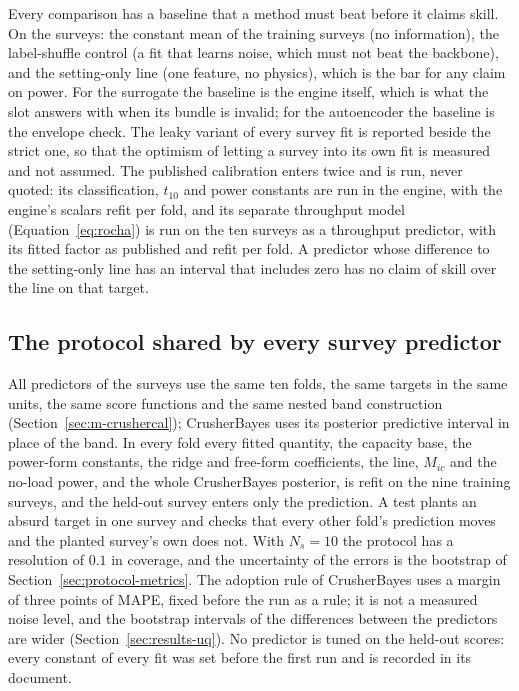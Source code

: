 Every comparison has a baseline that a method must beat before it claims skill. On the surveys: the constant mean of the training surveys
(no information), the label-shuffle control (a fit that learns noise, which must not beat the backbone), and the setting-only line (one
feature, no physics), which is the bar for any claim on power. For the surrogate the baseline is the engine itself, which is what the slot
answers with when its bundle is invalid; for the autoencoder the baseline is the envelope check. The leaky variant of every survey fit is
reported beside the strict one, so that the optimism of letting a survey into its own fit is measured and not assumed. The published
calibration enters twice and is run, never quoted: its classification, $t_{10}$ and power constants are run in the engine, with the engine's
scalars refit per fold, and its separate throughput model (Equation~\eqref{eq:rocha}) is run on the ten surveys as a throughput predictor,
with its fitted factor as published and refit per fold. A predictor whose difference to the setting-only line has an interval that includes
zero has no claim of skill over the line on that target.

\subsection{The protocol shared by every survey predictor}\label{sec:protocol-shared}

All predictors of the surveys use the same ten folds, the same targets in the same units, the same score functions and the same nested band
construction (Section~\ref{sec:m-crushercal}); CrusherBayes uses its posterior predictive interval in place of the band. In every fold every
fitted quantity, the capacity base, the power-form constants, the ridge and free-form coefficients, the line, $M_{ic}$ and the no-load power,
and the whole CrusherBayes posterior, is refit on the nine training surveys, and the held-out survey enters only the prediction. A test plants
an absurd target in one survey and checks that every other fold's prediction moves and the planted survey's own does not. With $N_s=10$ the
protocol has a resolution of $0.1$ in coverage, and the uncertainty of the errors is the bootstrap of Section~\ref{sec:protocol-metrics}. The
adoption rule of CrusherBayes uses a margin of three points of MAPE, fixed before the run as a rule; it is not a measured noise level, and the
bootstrap intervals of the differences between the predictors are wider (Section~\ref{sec:results-uq}). No predictor is tuned on the held-out scores: every constant of every fit was set before the first run and is
recorded in its document.

